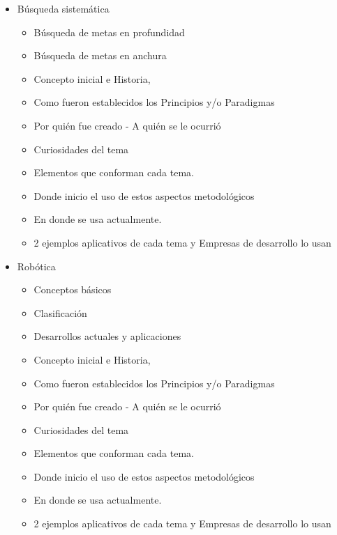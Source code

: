 \documentclass[12pt]{article}
\begin{document}
\begin{itemize}
	\item Búsqueda sistemática
		\begin{itemize}
		\item Búsqueda de metas en profundidad
		\item Búsqueda de metas en  anchura
		   \item Concepto inicial e Historia,
	\item Como fueron establecidos los Principios y/o Paradigmas
	\item Por quién fue creado - A quién se le ocurrió
	\item Curiosidades del tema
	\item Elementos que conforman cada tema.
	\item Donde inicio el uso de estos aspectos metodológicos
	\item En donde se usa actualmente.
	\item 2 ejemplos aplicativos de cada tema y Empresas de desarrollo lo usan
		\end{itemize}
	

    
    
    
    \item  Robótica
		\begin{itemize}
			\item Conceptos básicos
			\item Clasificación
			\item Desarrollos actuales y aplicaciones
			\item Concepto inicial e Historia,
			\item Como fueron establecidos los Principios y/o Paradigmas
			\item Por quién fue creado - A quién se le ocurrió
			\item Curiosidades del tema
			\item Elementos que conforman cada tema.
			\item Donde inicio el uso de estos aspectos metodológicos
			\item En donde se usa actualmente.
			 \item 2 ejemplos aplicativos de cada tema y Empresas de desarrollo lo usan
		\end{itemize}
    

\end{itemize}
\end{document}

